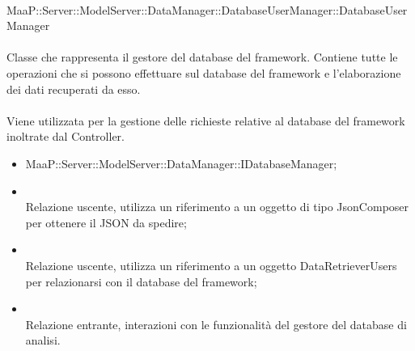\\
MaaP::Server::ModelServer::DataManager::DatabaseUserManager::DatabaseUserManager\\
\\
Classe che rappresenta il gestore del database del framework. Contiene tutte le operazioni che si possono effettuare sul database del framework e l'elaborazione dei dati recuperati da esso.\\
\\
Viene utilizzata per la gestione delle richieste relative al database del framework inoltrate dal Controller.\\
\begin{itemize}
\item MaaP::Server::ModelServer::DataManager::IDatabaseManager;
\end{itemize}
\begin{itemize}
\item{}\\
Relazione uscente, utilizza un riferimento a un oggetto di tipo JsonComposer per ottenere il JSON da spedire;
\item{}\\
Relazione uscente, utilizza un riferimento a un oggetto DataRetrieverUsers per relazionarsi con il database del framework;
\item{}\\
Relazione entrante, interazioni con le funzionalità del gestore del database di analisi.
\end{itemize}

